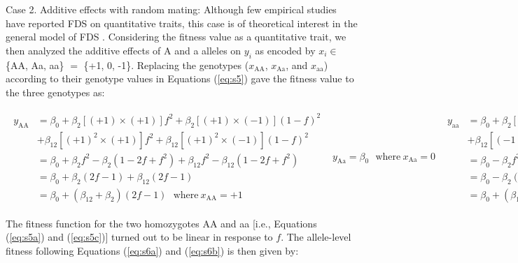 \documentclass[12pt,]{article}
\begin{document}
Case 2. Additive effects with random mating: Although few empirical studies have reported FDS on quantitative traits, this case is of theoretical interest in the general model of FDS \citep[e.g.,][]{schneider_maximization_2008}. Considering the fitness value as a quantitative trait, we then analyzed the additive effects of A and a alleles on $y_i$ as encoded by $x_i \in $ \{AA, Aa, aa\} $=$ \{+1, 0, -1\}. Replacing the genotypes ($x_\mathrm{AA}$, $x_\mathrm{Aa}$, and $x_\mathrm{aa}$) according to their genotype values in Equations (\ref{eq:s5}) gave the fitness value to the three genotypes as:

\begin{subequations}
\begin{gather}
    \begin{split}
y_\mathrm{AA} &= \beta_0 + \beta_2 [(+1)\times(+1)] f^2 + \beta_2 [(+1)\times(-1)] (1-f)^2 \\
& + \beta_{12} [(+1)^2\times(+1)] f^2 + \beta_{12} [(+1)^2\times(-1)] (1-f)^2 \\ 
&= \beta_0 + \beta_2f^2 - \beta_2(1-2f+f^2) + \beta_{12}f^2 - \beta_{12}(1-2f+f^2) \\
&= \beta_0 + \beta_2(2f - 1) + \beta_{12}(2f-1) \\ 
&= \beta_0 + (\beta_{12}+\beta_2)(2f-1)~~~\mathrm{where}~x_\mathrm{AA} = +1 \label{eq:s11a}
    \end{split}
\end{gather}
\begin{gather}
    y_\mathrm{Aa} = \beta_0~~~\mathrm{where}~x_\mathrm{Aa} = 0 \label{eq:s11b}
\end{gather}
\begin{gather}
    \begin{split}
y_\mathrm{aa} &= \beta_0 + \beta_2 [(-1)\times(+1)] f^2\ + \beta_2 [(-1)\times(+1)] (1-f)^2 \\
& + \beta_{12} [(-1)^2\times(+1)] f^2 + \beta_{12} [(-1)^2\times(-1)] (1-f)^2 \\
&= \beta_0 - \beta_2f^2 + \beta_2(1-2f+f^2) + \beta_{12}f^2 - \beta_{12}(1-2f+f^2) \\
&= \beta_0 - \beta_2(2f - 1) + \beta_{12}(2f-1) \\
&= \beta_0 + (\beta_{12} - \beta_2)(2f - 1)~~~\mathrm{where}~x_\mathrm{aa} = -1 \label{eq:s11c}
    \end{split}
\end{gather}
\end{subequations}

\noindent
The fitness function for the two homozygotes AA and aa [i.e., Equations (\ref{eq:s5a}) and (\ref{eq:s5c})] turned out to be linear in response to $f$. The allele-level fitness following Equations (\ref{eq:s6a}) and (\ref{eq:s6b}) is then given by:
\end{document}
